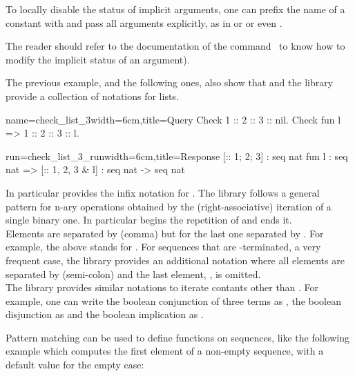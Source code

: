 To locally disable the
status of implicit arguments, one can prefix the name of a
constant with  and pass all arguments explicitly, as in
 or  or even
.

The reader should refer to the documentation of the 
command~\cite{Coq:manual} to know how to modify the implicit 
status of an argument). 

The previous example, and the following ones, also show
that \Coq{} and the \mcbMC{} library provide
a collection of notations for lists.

\begin{coq-left}{name=check_list_3}{width=6cm,title=Query}
Check 1 :: 2 :: 3 :: nil.
Check fun l => 1 :: 2 :: 3 :: l.
$~$
\end{coq-left}
\begin{coqout-right}{run=check_list_3_run}{width=6cm,title=Response}
[:: 1; 2; 3] : seq nat
fun l : seq nat => [:: 1, 2, 3 & l]
  : seq nat -> seq nat
\end{coqout-right}
\index[coq]{\C{[:: .. , .. & ..]}}

In particular \Coq{} provides the infix notation \C{::} for
.  The \mcbMC{} library follows a general pattern for
n-ary operations obtained by the (right-associative)
iteration of a single binary one. In
particular \C{[::} begins the repetition
of \C{::} and \C{]} ends it.\\
Elements are separated by \C{,} (comma)
but for the last one separated by \C{&}.
For example, the above \C{[:: 1, 2, 3 & l]} stands for
.
For sequences that are -terminated, a very frequent case,
the \mcbMC{} library provides an additional notation where all elements are
separated by \C{;} (semi-colon) and the last element, ,
is omitted.
\index[coq]{\C{[seq .. ; ..]}}\\
The \mcbMC{} library provides similar notations 
to iterate contants other than .
For example, one can write  the boolean conjunction
of three terms as , the 
boolean disjunction as \C{[|| b1, b2 | b3]} and the boolean
implication as \C{[==> b1, b2 => b3]}.
\index[coq]{\C{["|"| .. , .. "| ..]}}
\index[coq]{\C{[&& .. , .. & ..]}}
\index[coq]{\C{[==> .. , .. => ..]}}

Pattern matching can be used to define functions on sequences, like
the following example which computes the first element of a non-empty
sequence, with a default value for the empty case:

